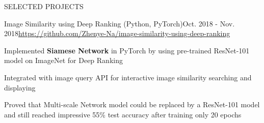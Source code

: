 \documentclass{resume} %
\begin{document}
\begin{rSection}{SELECTED PROJECTS}

\begin{rSubsection}{Image Similarity using Deep Ranking (Python, PyTorch)}{Oct. 2018 - Nov. 2018}{\url{https://github.com/Zhenye-Na/image-similarity-using-deep-ranking}}{}
\item Implemented \textbf{Siamese Network} in PyTorch by using pre-trained ResNet-101 model on ImageNet for Deep Ranking
\item Integrated with image query API for interactive image similarity searching and displaying
\item Proved that Multi-scale Network model could be replaced by a ResNet-101 model and still reached impressive 55\% test accuracy after training only 20 epochs
\end{rSubsection}







\end{rSection}
\end{document}
